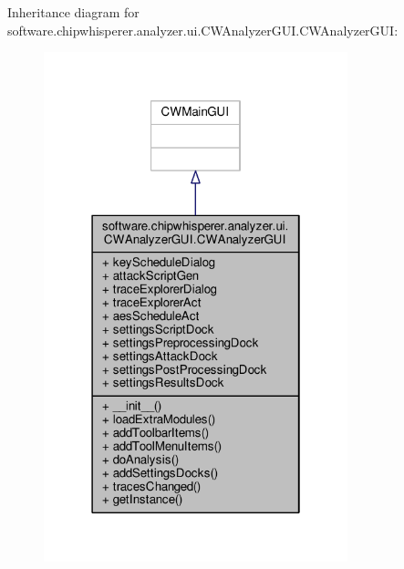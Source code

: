 Inheritance diagram for software.\+chipwhisperer.\+analyzer.\+ui.\+C\+W\+Analyzer\+G\+U\+I.\+C\+W\+Analyzer\+G\+U\+I\+:\nopagebreak
\begin{figure}[H]
\begin{center}
\leavevmode
\includegraphics[width=250pt]{d4/d65/classsoftware_1_1chipwhisperer_1_1analyzer_1_1ui_1_1CWAnalyzerGUI_1_1CWAnalyzerGUI__inherit__graph}
\end{center}
\end{figure}


